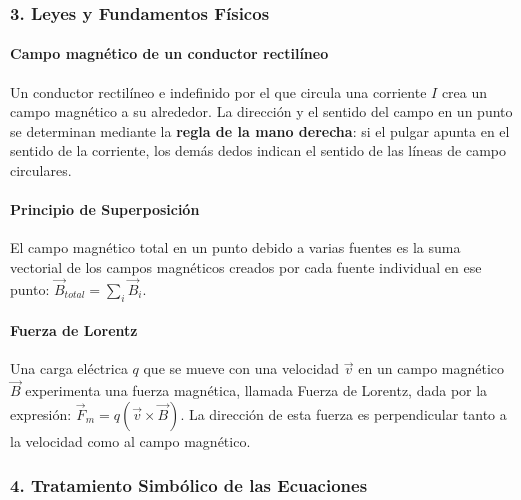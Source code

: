 \subsubsection*{3. Leyes y Fundamentos Físicos}
\paragraph*{Campo magnético de un conductor rectilíneo} Un conductor rectilíneo e indefinido por el que circula una corriente $I$ crea un campo magnético a su alrededor. La dirección y el sentido del campo en un punto se determinan mediante la \textbf{regla de la mano derecha}: si el pulgar apunta en el sentido de la corriente, los demás dedos indican el sentido de las líneas de campo circulares.

\paragraph*{Principio de Superposición} El campo magnético total en un punto debido a varias fuentes es la suma vectorial de los campos magnéticos creados por cada fuente individual en ese punto: $\vec{B}_{total} = \sum_i \vec{B}_i$.

\paragraph*{Fuerza de Lorentz} Una carga eléctrica $q$ que se mueve con una velocidad $\vec{v}$ en un campo magnético $\vec{B}$ experimenta una fuerza magnética, llamada Fuerza de Lorentz, dada por la expresión: $\vec{F}_m = q(\vec{v} \times \vec{B})$. La dirección de esta fuerza es perpendicular tanto a la velocidad como al campo magnético.

\subsubsection*{4. Tratamiento Simbólico de las Ecuaciones}
